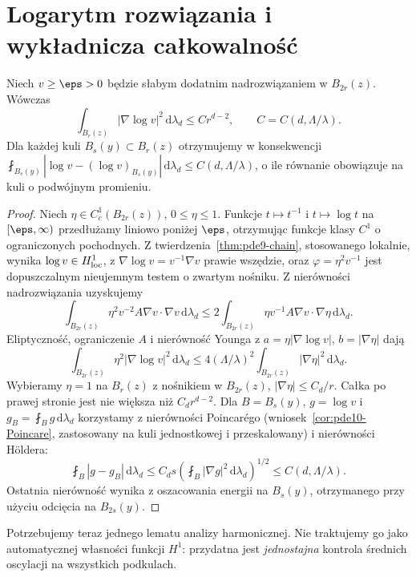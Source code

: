 \section{Logarytm rozwiązania i wykładnicza całkowalność}
\label{sec:pde17-log}
\begin{lemat}
\label{lem:pde17-log}
Niech $v\ge\eps>0$ będzie słabym dodatnim nadrozwiązaniem
w $B_{2r}(z)$. Wówczas
\begin{equation}\label{eq:pde17-log}
 \int_{B_r(z)}|\nabla\log v|^2\,\mathrm d\lambda_d
 \le C r^{d-2},\qquad C=C(d,\Lambda/\lambda).
\end{equation}
Dla każdej kuli $B_s(y)\subset B_r(z)$ otrzymujemy w konsekwencji
$\fint_{B_s(y)}|\log v-(\log v)_{B_s(y)}|\,\mathrm d\lambda_d
\le C(d,\Lambda/\lambda)$, o ile równanie obowiązuje
na kuli o podwójnym promieniu.
\end{lemat}
\begin{proof}
Niech $\eta\in C_c^1(B_{2r}(z))$, $0\le\eta\le1$.
Funkcje $t\mapsto t^{-1}$ i $t\mapsto\log t$ na
$[\eps,\infty)$ przedłużamy liniowo poniżej $\eps$,
otrzymując funkcje klasy $C^1$ o ograniczonych pochodnych.
Z twierdzenia~\ref{thm:pde9-chain}, stosowanego lokalnie,
wynika $\log v\in H^1_{\rm loc}$, z
$\nabla\log v=v^{-1}\nabla v$ prawie wszędzie, oraz
$\varphi=\eta^2v^{-1}$ jest dopuszczalnym nieujemnym
testem o zwartym nośniku. Z nierówności nadrozwiązania
uzyskujemy
\[
 \int_{B_{2r}(z)}\eta^2v^{-2}A\nabla v\cdot\nabla v\,\mathrm d\lambda_d
 \le 2\int_{B_{2r}(z)}\eta v^{-1}A\nabla v\cdot\nabla\eta\,\mathrm d\lambda_d.
\]
Eliptyczność, ograniczenie $A$ i nierówność Younga
z $a=\eta|\nabla\log v|$, $b=|\nabla\eta|$ dają
\[
 \int_{B_{2r}(z)}\eta^2|\nabla\log v|^2\,\mathrm d\lambda_d
 \le 4(\Lambda/\lambda)^2
 \int_{B_{2r}(z)}|\nabla\eta|^2\,\mathrm d\lambda_d.
\]
Wybieramy $\eta=1$ na $B_r(z)$ z nośnikiem w $B_{2r}(z)$,
$|\nabla\eta|\le C_d/r$. Całka po prawej stronie jest
nie większa niż $C_d r^{d-2}$.
Dla $B=B_s(y)$, $g=\log v$ i
$g_B=\fint_B g\,\mathrm d\lambda_d$ korzystamy z nierówności
Poincarégo (wniosek~\ref{cor:pde10-Poincare}, zastosowany
na kuli jednostkowej i przeskalowany) i nierówności Höldera:
\[
 \fint_B |g-g_B|\,\mathrm d\lambda_d
 \le C_d s\left(\fint_B|\nabla g|^2\,\mathrm d\lambda_d\right)^{1/2}
 \le C(d,\Lambda/\lambda).
\]
Ostatnia nierówność wynika z oszacowania energii na $B_s(y)$,
otrzymanego przy użyciu odcięcia na $B_{2s}(y)$.
\end{proof}

Potrzebujemy teraz jednego lematu analizy harmonicznej.
Nie traktujemy go jako automatycznej własności funkcji $H^1$:
przydatna jest \emph{jednostajna} kontrola średnich oscylacji
na wszystkich podkulach.

